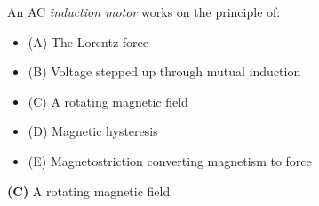 

An AC {\it induction motor} works on the principle of:

\begin{itemize}
\item{(A)} The Lorentz force
\vskip 5pt 
\item{(B)} Voltage stepped up through mutual induction
\vskip 5pt 
\item{(C)} A rotating magnetic field
\vskip 5pt 
\item{(D)} Magnetic hysteresis
\vskip 5pt 
\item{(E)} Magnetostriction converting magnetism to force
\end{itemize}







{\bf (C)} A rotating magnetic field











